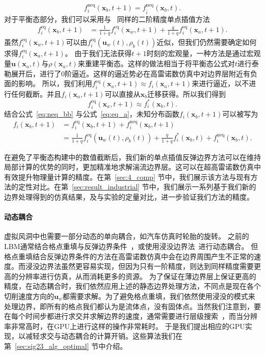 \begin{equation}
\label{eq:neq_bb}
f^\text{neq}_{i}(\bm{x}_b, t\!+\!1) = f^\text{neq}_{\bar{i}}(\bm{x}_b, t).
\end{equation}
对于平衡态部分，我们可以采用与~\citep{Tao-2018-b} 同样的二阶精度单点插值方法
\begin{align}
f^\text{eq}_i(\bm{x}_b, t\!+\!1) &= \frac{1}{1+q}f^\text{eq}_{i}(\bm{x}_w, t\!+\!1) + \frac{q}{1+q}f^\text{eq}_{i}(\bm{x}_a, t\!+\!1).
\end{align}
虽然$f^\text{eq}_{i}(\bm{x}_w, t\!+\!1)$可以由$f_{i}^\text{eq}(\bm{u}_w(t), \rho_b(t))$近似，但我们仍然需要确定如何求得$f^\text{eq}_{i}(\bm{x}_a, t\!+\!1)$。
由于我们无法获得$t+1$时刻的宏观量，一种方法是通过宏观量$\bm{u}(\bm{x}_a, t)$与$\rho(\bm{x}_a, t)$来重建平衡态。这样的做法相当于将平衡态公式对$t$进行泰勒展开后，进行了0阶逼近。这样的逼近势必在高雷诺数仿真中对边界层附近有负面的影响。
所以，我们利用$f^\text{eq}_{i}(\bm{x}_a, t\!+\!1) \approx f_{i}(\bm{x}_a, t\!+\!1)$来进行逼近，以不进行任何截断。并且$f_{i}(\bm{x}_a, t\!+\!1)$可以直接从$\bm{x}_b$迁移获得。所以我们得到
\begin{equation}
\label{eq:eq_a}
f^\text{eq}_{i}(\bm{x}_a, t\!+\!1) \approx f^{*}_{i}(\bm{x}_b, t).
\end{equation}
结合公式~\ref{eq:neq_bb} 与公式~\ref{eq:eq_a}，未知分布函数$f_i(\bm{x}_b, t\!+\!1)$可以被写为
\begin{align}
f_i(\bm{x}_b, t\!+\!1) &= f^\text{eq}_i(\bm{x}_b, t\!+\!1) + f^\text{neq}_{i}(\bm{x}_b, t\!+\!1) \\
&= \frac{1}{1\!+\!q}f_{i}^\text{eq}(\bm{u}_w(t), \rho_b(t)) + \frac{q}{1\!+\!q}f^{*}_{i}(\bm{x}_b, t) + f^\text{neq}_{\bar{\imath}}(\bm{x}_b, t).\nonumber
\end{align}

在避免了平衡态构建中的数值截断后，我们新的单点插值反弹边界方法可以在维持局部计算的优势的同时，更加精准地求解湍流边界层。这可以在超高雷诺数仿真中有效提升物理量计算的精度。在第~\ref{sec:4_comp} 节中，我们展示该方法与现有方法的定性对比。在第~\ref{sec:result_industrial} 节中，我们展示一系列基于我们新的边界处理得到的仿真结果，及与实验的定量对比，进一步验证我们方法的精度。

\paragraph{动态耦合}
虚拟风洞中也需要一部分动态的单向耦合，如汽车仿真时轮胎的旋转。
之前的LBM通常结合格点重填与反弹边界条件~\citep{Tao-2016}，或使用浸没边界法~\citep{Li-2016, Li-2020}进行动态耦合。
但格点重填结合反弹边界条件的方法在高雷诺数仿真中会在边界周围产生不正常的速度。而浸没边界法虽然更容易实现，但因为只有一阶精度，则达到同样精度需要更高的分辨率进行仿真，从而消耗更多的资源。
为了保证在薄边界层上保证更高的精度，在动态耦合时，我们依然应用上述的静态边界处理方法，不同点是现在各个切削速度方向的$\bm{u}_w$都需要求解。为了避免格点重填，我们依然使用浸没的模式来处理边界，即所有的格点我们都认为是流体点，没有固体点。当然我们注意到，要在每个时间步都进行求交并求解边界的速度，通常需要进行层级搜索~\citep{Karras-2012}，而当分辨率非常高时，在GPU上进行这样的操作非常耗时。
于是我们提出相应的GPU实现，以减轻求交与动态耦合的计算开销。这些算法我们在第~\ref{sec:sig23_alg_optimal} 节中介绍。

